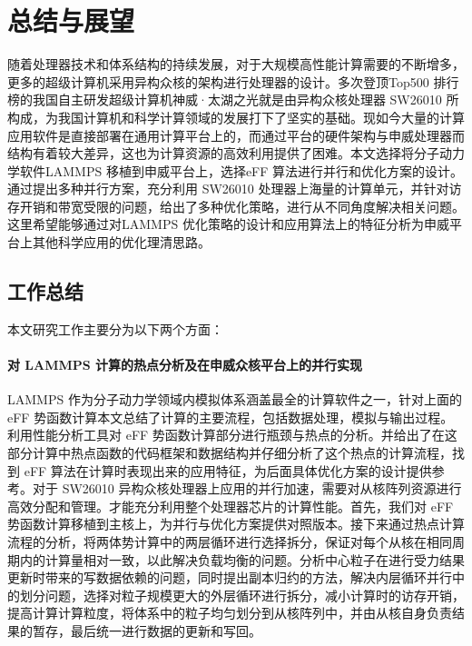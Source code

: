 
\chapter{总结与展望}
随着处理器技术和体系结构的持续发展，对于大规模高性能计算需要的不断增多，更多的超级计算机采用异构众核的架构进行处理器的设计。多次登顶Top500 排行榜的我国自主研发超级计算机神威·太湖之光就是由异构众核处理器 SW26010 所构成，为我国计算机和科学计算领域的发展打下了坚实的基础。现如今大量的计算应用软件是直接部署在通用计算平台上的，而通过平台的硬件架构与申威处理器而结构有着较大差异，这也为计算资源的高效利用提供了困难。本文选择将分子动力学软件LAMMPS 移植到申威平台上，选择eFF 算法进行并行和优化方案的设计。通过提出多种并行方案，充分利用 SW26010 处理器上海量的计算单元，并针对访存开销和带宽受限的问题，给出了多种优化策略，进行从不同角度解决相关问题。这里希望能够通过对LAMMPS 优化策略的设计和应用算法上的特征分析为申威平台上其他科学应用的优化理清思路。

\section{工作总结}
本文研究工作主要分为以下两个方面：

\subsubsection{对 LAMMPS 计算的热点分析及在申威众核平台上的并行实现}
LAMMPS 作为分子动力学领域内模拟体系涵盖最全的计算软件之一，针对上面的 eFF 势函数计算本文总结了计算的主要流程，包括数据处理，模拟与输出过程。利用性能分析工具对 eFF 势函数计算部分进行瓶颈与热点的分析。并给出了在这部分计算中热点函数的代码框架和数据结构并仔细分析了这个热点的计算流程，找到 eFF 算法在计算时表现出来的应用特征，为后面具体优化方案的设计提供参考。对于 SW26010 异构众核处理器上应用的并行加速，需要对从核阵列资源进行高效分配和管理。才能充分利用整个处理器芯片的计算性能。首先，我们对 eFF 势函数计算移植到主核上，为并行与优化方案提供对照版本。接下来通过热点计算流程的分析，将两体势计算中的两层循环进行选择拆分，保证对每个从核在相同周期内的计算量相对一致，以此解决负载均衡的问题。分析中心粒子在进行受力结果更新时带来的写数据依赖的问题，同时提出副本归约的方法，解决内层循环并行中的划分问题，选择对粒子规模更大的外层循环进行拆分，减小计算时的访存开销，提高计算计算粒度，将体系中的粒子均匀划分到从核阵列中，并由从核自身负责结果的暂存，最后统一进行数据的更新和写回。

